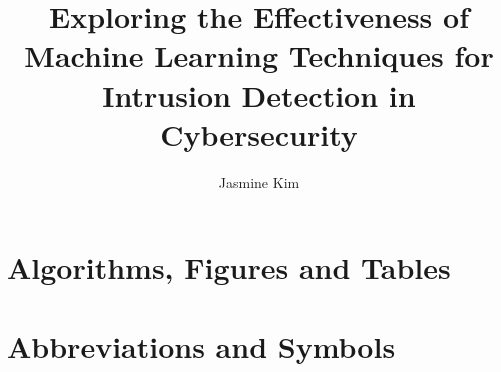 \documentclass[
	USenglish,             %
	accentcolor=9b,        %
	BCOR=0mm,              %
	class=report,          %
	custommargins=false,   %
	fontsize=11pt,
	instbox=true,          %
	marginpar=false,       %
	parskip=half-,         %
	pdfa=true,             %
	ruledheaders=section,  %
	thesis={type=master},  %
	oneside,               %
]{tudapub}
\title{Exploring the Effectiveness of Machine Learning Techniques for Intrusion Detection in Cybersecurity}  %
\author[J. Kim]{Jasmine Kim}  %
\begin{document}
	{
		\maketitle
	}

	\cleardoublepage
	{
		
		
		
	}
	\glsresetall  %

	\cleardoublepage
	{
		\tableofcontents

		\chapter*{Algorithms, Figures and Tables}
			\listofalgorithms
			\listoffigures
			\listoftables

		\chapter*{Abbreviations and Symbols}
			\printunsrtglossary[type=abbreviations]
			\printunsrtglossary[type=symbols]
	}

	\cleardoublepage
	{
		
		
		
		
		
		
		
	}

	\cleardoublepage
	{
		\printbibliography
	}

	\cleardoublepage
	{
		\appendix
		
	}
\end{document}

